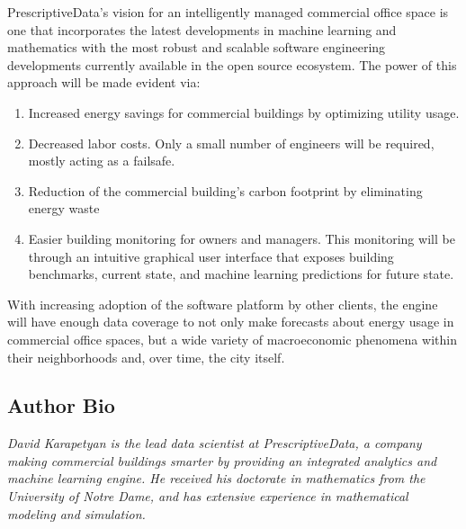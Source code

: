 \documentclass[12pt]{article}
\begin{document}
PrescriptiveData's vision for an intelligently managed commercial office space is one
that incorporates the latest developments in machine learning and mathematics
with the most robust and scalable software engineering developments currently
available in the open source ecosystem. The power of this approach will be made
evident via:
\begin{enumerate}[1)]
	\item Increased energy savings for commercial buildings by optimizing utility
		usage.
	\item Decreased labor costs. Only a small number of engineers will be
		required, mostly acting as a failsafe.
	\item Reduction of the commercial building's carbon footprint by eliminating
		energy waste
	\item Easier building monitoring for owners and managers. This monitoring will
		be through an intuitive graphical user interface that exposes
		building benchmarks, current state, and machine learning predictions for
		future state.
\end{enumerate}
With increasing adoption of the
software platform by other clients, the engine will have enough data coverage to
not only make forecasts about energy usage in commercial office spaces, but a
wide variety of macroeconomic phenomena within their neighborhoods and, over
time, the city itself. 

\subsection*{Author Bio}
\textit{David Karapetyan is the lead data scientist at PrescriptiveData, a company
making commercial buildings smarter by providing an integrated analytics and
machine learning engine. He received his doctorate in mathematics from the
University of Notre Dame, and has extensive experience in mathematical modeling
and simulation.}
\end{document}
